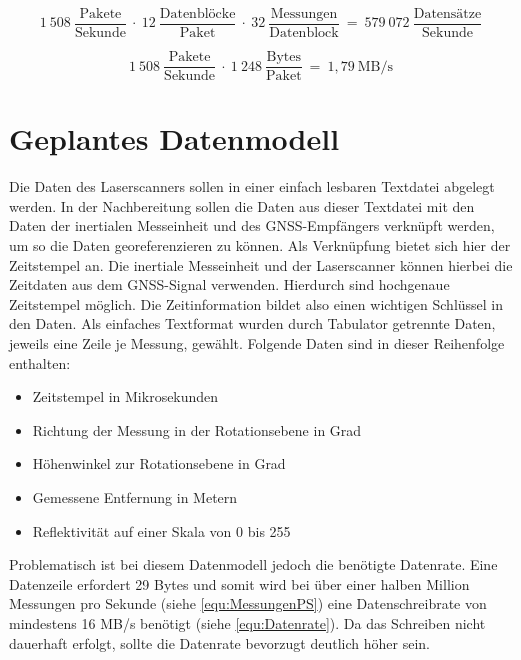\documentclass[a4paper,12pt,bibliography=totoc, listof=totoc,titlepage,pointlessnumbers]{scrreprt}
\begin{document}
\begin{equation}
1~508~\frac{\text{Pakete}}{\text{Sekunde}}~\cdot~12~\frac{\text{Datenbl\"{o}cke}}{\text{Paket}}~\cdot~
32~\frac{\text{Messungen}}{\text{Datenblock}}~=~579~072~\frac{\text{Datens\"{a}tze}}{\text{Sekunde}}
 \label{equ:MessungenPS}
\end{equation}

\begin{equation}
1~508~\frac{\text{Pakete}}{\text{Sekunde}}~\cdot~1~248~\frac{\text{Bytes}}{\text{Paket}}~=~1,79~\text{MB/s}
 \label{equ:Ausgangsrate}
\end{equation}

\section{Geplantes Datenmodell}
\label{s:datenmodell}
Die Daten des Laser\-scan\-ners sollen in einer einfach lesbaren Textdatei abgelegt werden. In der Nachbereitung sollen die Daten aus dieser Textdatei mit den Daten der inertialen Messeinheit und des GNSS-Empfängers verknüpft werden, um so die Daten georeferenzieren zu können. Als Verknüpfung bietet sich hier der Zeitstempel an. Die inertiale Messeinheit und der Laser\-scan\-ner können hierbei die Zeitdaten aus dem GNSS-Signal verwenden. Hierdurch sind hochgenaue Zeitstempel möglich. Die Zeitinformation bildet also einen wichtigen Schlüssel in den Daten. Als einfaches Textformat wurden durch Tabulator getrennte Daten, jeweils eine Zeile je Messung, gewählt. Folgende Daten sind in dieser Reihenfolge enthalten:

\begin{itemize}
 \item Zeitstempel in Mikrosekunden
 \item Richtung der Messung in der Rotationsebene in Grad
 \item Höhenwinkel zur Rotationsebene in Grad
 \item Gemessene Entfernung in Metern
 \item Reflektivität auf einer Skala von 0 bis 255
\end{itemize}

Problematisch ist bei diesem Datenmodell jedoch die benötigte Datenrate. Eine Datenzeile erfordert 29 Bytes und somit wird bei über einer halben Million Messungen pro Sekunde (siehe \autoref{equ:MessungenPS}) eine Datenschreibrate von mindestens 16 MB/s benötigt (siehe \autoref{equ:Datenrate}). Da das Schreiben nicht dauerhaft erfolgt, sollte die Datenrate bevorzugt deutlich höher sein.
\end{document}
